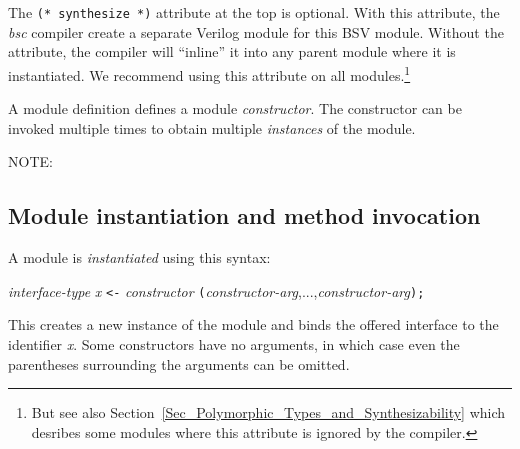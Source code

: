 
The \verb|(* synthesize *)| attribute at the top is optional.  With
this attribute, the \emph{bsc} compiler create a separate Verilog
module for this BSV module.  Without the attribute, the compiler will
``inline'' it into any parent module where it is instantiated.  We
recommend using this attribute on all modules.\footnote{But see also
Section~\ref{Sec_Polymorphic_Types_and_Synthesizability} which
desribes some modules where this attribute is ignored by the
compiler.}


A module definition defines a module \emph{constructor}. The
constructor can be invoked multiple times to obtain multiple
\emph{instances} of the module.

\vspace{2ex}

NOTE:


\subsection{Module instantiation and method invocation}

\label{Sec_Module_instantiation_and_method_invocation}


A module is \emph{instantiated} using this syntax:

\hm \emph{interface-type} \emph{x} {\tt <-} \emph{constructor} {\tt (}\emph{constructor-arg},...,\emph{constructor-arg}{\tt );}

This creates a new instance of the module and binds the offered
interface to the identifier \emph{x}.  Some constructors have no
arguments, in which case even the parentheses surrounding the
arguments can be omitted.

